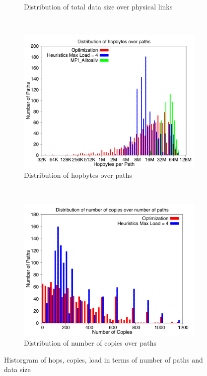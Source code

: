 \begin{figure}[!htbp]
\begin{subfigure}[b]{0.49\textwidth}
                \caption{Distribution of total data size over physical links}
                \label{fig:3_1024_loaddata}
        \end{subfigure}
        ~ %
        \begin{subfigure}[b]{0.49\textwidth}
                \includegraphics[width=\textwidth]{report_figures/constantr/3_1024/hopbyte_histo.pdf}
                \caption{Distribution of hopbytes over paths}
                \label{fig:3_1024_hopbyte}
        \end{subfigure}
        ~ %
        \begin{subfigure}[b]{0.49\textwidth}
                \includegraphics[width=\textwidth]{report_figures/constantr/3_1024/hopcopy_histo.pdf}
                \caption{Distribution of number of copies over paths}
                \label{fig:3_1024_hopcopy}
        \end{subfigure}
        \caption{Historgram of hops, copies, load in terms of number of paths and data size}
        \label{fig:3_1024_histo}
\end{figure}

